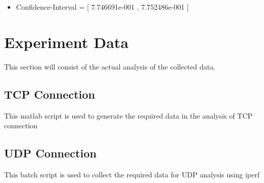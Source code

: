 \documentclass[aps,letterpaper,10pt]{revtex4}
\begin{document}
\begin{itemize}
\begin{itemize}
                        \item Confidence-Interval = [ 7.746691e-001 , 7.752486e-001 ]
                    \end{itemize}
                    \begin{figure}[htp]
                        \begin{center}
                        \end{center}
                    \end{figure}
            \end{itemize}



\newpage
\section{Experiment Data}
This section will consist of the actual analysis of the collected data.  \vspace{5mm}
    \subsection{TCP Connection}
    This matlab script is used to generate the required data in the analysis of TCP connection    
    	
    	\vspace{3mm}
        \newpage
    \subsection{UDP Connection}
    This batch script is used to collect the required data for UDP analysis using iperf
        
    	\vspace{3mm}

                
                

\end{document}
